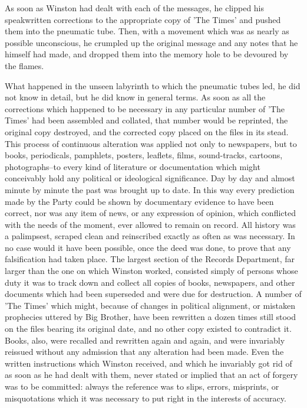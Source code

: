 \documentclass{article}
\begin{document}
As soon as Winston had dealt with each of the messages, he clipped his
speakwritten corrections to the appropriate copy of 'The Times' and pushed
them into the pneumatic tube. Then, with a movement which was as nearly as
possible unconscious, he crumpled up the original message and any notes
that he himself had made, and dropped them into the memory hole to be
devoured by the flames.

What happened in the unseen labyrinth to which the pneumatic tubes led, he
did not know in detail, but he did know in general terms. As soon as all
the corrections which happened to be necessary in any particular number
of 'The Times' had been assembled and collated, that number would be
reprinted, the original copy destroyed, and the corrected copy placed on
the files in its stead. This process of continuous alteration was applied
not only to newspapers, but to books, periodicals, pamphlets, posters,
leaflets, films, sound-tracks, cartoons, photographs--to every kind of
literature or documentation which might conceivably hold any political or
ideological significance. Day by day and almost minute by minute the past
was brought up to date. In this way every prediction made by the Party
could be shown by documentary evidence to have been correct, nor was any
item of news, or any expression of opinion, which conflicted with the
needs of the moment, ever allowed to remain on record. All history was
a palimpsest, scraped clean and reinscribed exactly as often as was
necessary. In no case would it have been possible, once the deed was done,
to prove that any falsification had taken place. The largest section of
the Records Department, far larger than the one on which Winston worked,
consisted simply of persons whose duty it was to track down and collect all
copies of books, newspapers, and other documents which had been superseded
and were due for destruction. A number of 'The Times' which might, because
of changes in political alignment, or mistaken prophecies uttered by Big
Brother, have been rewritten a dozen times still stood on the files bearing
its original date, and no other copy existed to contradict it. Books, also,
were recalled and rewritten again and again, and were invariably reissued
without any admission that any alteration had been made. Even the written
instructions which Winston received, and which he invariably got rid of
as soon as he had dealt with them, never stated or implied that an act of
forgery was to be committed: always the reference was to slips, errors,
misprints, or misquotations which it was necessary to put right in the
interests of accuracy.
\end{document}

